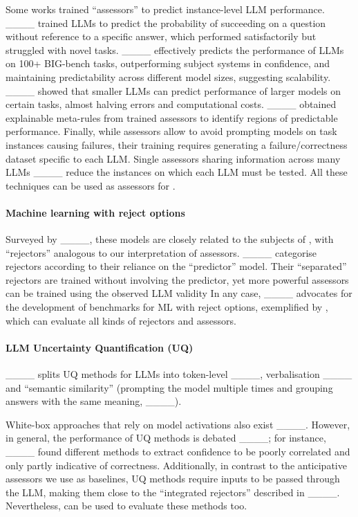Some works trained ``assessors'' to predict instance-level LLM performance. %
____ trained LLMs to predict the probability of succeeding on a question without reference to %
a specific answer, %
which performed satisfactorily but struggled with novel tasks. 
____ effectively predicts the performance of LLMs on 100+ BIG-bench tasks, outperforming subject systems in confidence, and maintaining predictability across different model sizes, suggesting scalability.
____  showed that smaller LLMs can %
predict performance of %
larger models %
on certain tasks, almost halving errors and computational costs. %
____ obtained explainable meta-rules from trained assessors to identify regions of predictable performance. 
Finally, while assessors allow to avoid prompting models on task instances causing failures, their training requires generating a failure/correctness dataset specific to each LLM. Single assessors  sharing information across many LLMs ____ reduce the instances on which each LLM must be tested.
All these techniques can be used as assessors for 
\predbench.


\paragraph{Machine learning with reject options} %
Surveyed by ____, these models are closely related %
to the subjects of \predbench, with ``rejectors'' analogous to our interpretation of assessors. ____ categorise rejectors according to their reliance on the ``predictor'' model.  %
Their ``separated'' rejectors are trained without involving the predictor, yet more powerful assessors %
can be trained using the observed LLM validity %
In any case, ____ advocates for the %
development of benchmarks for %
ML with reject options, exemplified by %
\predbench, which can evaluate all kinds of rejectors and assessors.%

\paragraph{LLM Uncertainty Quantification (UQ)}
____ splits UQ methods for LLMs into token-level ____, verbalisation ____ and ``semantic similarity'' (prompting the model multiple times and grouping answers with the same meaning, ____). 

White-box approaches that rely on model activations also exist ____.
However, in general, the performance of UQ methods is debated ____; for instance, ____ found  different methods to extract confidence to be poorly correlated and only partly indicative of correctness.
Additionally, in contrast to the anticipative assessors we use as baselines, %
UQ methods require inputs to be passed through the LLM, making them close to the ``integrated rejectors'' described in ____. Nevertheless, \predbench can be used to evaluate these methods too.



